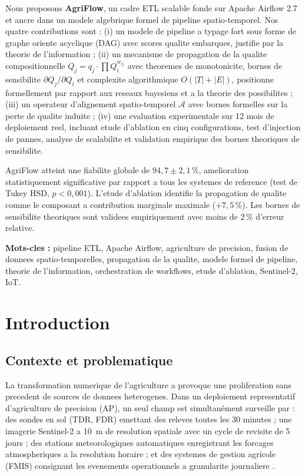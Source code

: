 \documentclass[12pt,a4paper]{article}
\theoremstyle{plain}
\theoremstyle{definition}
\theoremstyle{remark}
\begin{document}
\begin{titlepage}
Nous proposons \textbf{AgriFlow}, un cadre ETL scalable fonde sur Apache
Airflow 2.7 et ancre dans un modele algebrique formel de pipeline
spatio-temporel. Nos quatre contributions sont :
(i) un modele de pipeline a typage fort sous forme de graphe oriente
acyclique (DAG) avec scores qualite embarques, justifie par la theorie
de l'information ;
(ii) un mecanisme de propagation de la qualite compositionnelle
$Q_j = q_j \cdot \prod Q_i^{w_{ij}}$ avec theoremes de monotonicite,
bornes de sensibilite $\partial Q_j/\partial Q_i$ et complexite
algorithmique $O(|T|+|E|)$, positionne formellement par rapport aux
reseaux bayesiens et a la theorie des possibilites ;
(iii) un operateur d'alignement spatio-temporel $\mathcal{A}$ avec
bornes formelles sur la perte de qualite induite ;
(iv) une evaluation experimentale sur 12 mois de deploiement reel,
incluant etude d'ablation en cinq configurations, test d'injection de
pannes, analyse de scalabilite et validation empirique des bornes
theoriques de sensibilite.

AgriFlow atteint une fiabilite globale de $94{,}7 \pm 2{,}1\,\%$, amelioration
statistiquement significative par rapport a tous les systemes de reference
(test de Tukey HSD, $p<0{,}001$). L'etude d'ablation identifie la
propagation de qualite comme le composant a contribution marginale maximale
($+7{,}5\,\%$). Les bornes de sensibilite theoriques sont validees
empiriquement avec moins de $2\,\%$ d'erreur relative.

\bigskip
\noindent\textbf{Mots-cles :}
pipeline ETL, Apache Airflow, agriculture de precision, fusion de donnees
spatio-temporelles, propagation de la qualite, modele formel de pipeline,
theorie de l'information, orchestration de workflows, etude d'ablation,
Sentinel-2, IoT.
\end{titlepage}

\tableofcontents
\newpage

\section{Introduction}
\label{sec:intro}

\subsection{Contexte et problematique}

La transformation numerique de l'agriculture a provoque une proliferation
sans precedent de sources de donnees heterogenes. Dans un deploiement
representatif d'agriculture de precision (AP), un seul champ est
simultanément surveille par : des sondes en sol (TDR, FDR) emettant
des releves toutes les 30 minutes ; une imagerie Sentinel-2 a 10~m de
resolution spatiale avec un cycle de revisite de 5 jours ; des stations
meteorologiques automatiques enregistrant les forcages atmospheriques a
la resolution horaire ; et des systemes de gestion agricole (FMIS)
consignant les evenements operationnels a granularite journaliere
\cite{iot_review_2025,smart_sensors_2024}.
\end{document}

